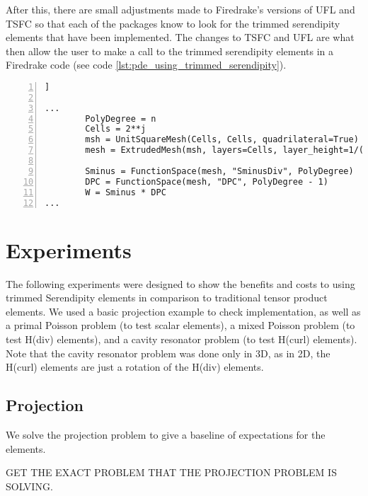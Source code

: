 \documentclass[manuscript,screen]{acmart}
\begin{document}
After this, there are small adjustments made to Firedrake's versions of UFL and TSFC so that each of the packages know to look for the trimmed serendipity elements that have been implemented.  The changes to TSFC and UFL are what then allow the user to make a call to the trimmed serendipity elements in a Firedrake code (see code \ref{lst:pde_using_trimmed_serendipity}).

\lstset{language=Python}
\begin{lstlisting}[frame=single, caption={Setting up Firedrake to use the trimmed serendipity elements in a mixed Poisson problem in 3d.}, label={lst:pde_using_trimmed_serendipity}, numbers=left]] 

...
        PolyDegree = n
        Cells = 2**j
        msh = UnitSquareMesh(Cells, Cells, quadrilateral=True)
        mesh = ExtrudedMesh(msh, layers=Cells, layer_height=1/(Cells))

        Sminus = FunctionSpace(mesh, "SminusDiv", PolyDegree)
        DPC = FunctionSpace(mesh, "DPC", PolyDegree - 1)
        W = Sminus * DPC
...

\end{lstlisting}

  \section{Experiments}
    
   The following experiments were designed to show the benefits and costs to using trimmed Serendipity elements in comparison to traditional tensor product elements.  We used a basic projection example to check implementation, as well as a primal Poisson problem (to test scalar elements), a mixed Poisson problem (to test H(div) elements), and a cavity resonator problem (to test H(curl) elements).  Note that the cavity resonator problem was done only in 3D, as in 2D, the H(curl) elements are just a rotation of the H(div) elements. 

\newpage
  \subsection{Projection}
  
  We solve the projection problem to give a baseline of expectations for the elements.  
  
  GET THE EXACT PROBLEM THAT THE PROJECTION PROBLEM IS SOLVING.
\end{document}

